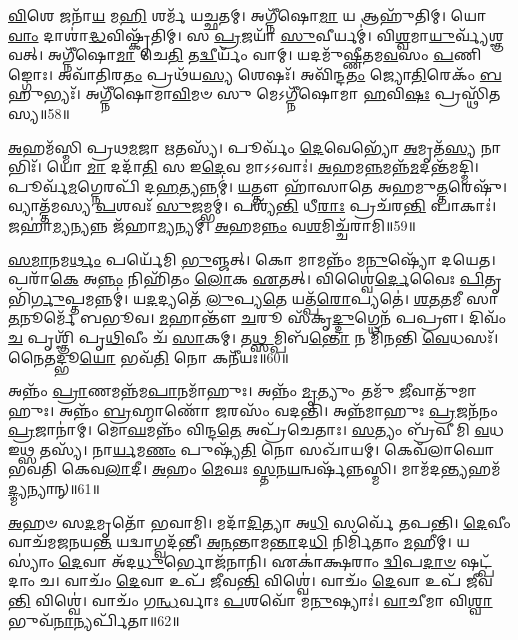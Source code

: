 \-\ul{𑌵𑌿}\-𑌶𑍇 𑌜𑌨𑌾᳴\-\ul{𑌯} 𑌮\-\ul{𑌹𑌿} 𑌶𑌰𑍍𑌮᳴ 𑌯𑌚𑍍𑌛𑌤𑌮𑍍।
𑌅𑌗𑍍𑌨𑍀᳴𑌷𑍋\-\ul{𑌮𑌾} 𑌯 𑌆𑌹𑍁᳴𑌤𑌿𑌮𑍍।
𑌯𑍋 \ul{𑌵𑌾𑌂} 𑌦𑌾𑌶𑌾॑\-\ul{𑌦𑍍𑌧}\-𑌵𑌿𑌷𑍍𑌕𑍃᳴𑌤𑌿𑌮𑍍।
𑌸 \ul{𑌪𑍍𑌰}\-𑌜𑌯𑌾᳴ \ul{𑌸𑍁}\-𑌵𑍀𑌰𑍍𑌯𑌮𑍍॑।
𑌵𑌿\-\ul{𑌶𑍍𑌵}\-𑌮𑌾\-\ul{𑌯𑍁}\-𑌰𑍍𑌵𑍍𑌯᳴𑌶𑍍𑌞𑌵𑌤𑍍।
𑌅𑌗𑍍𑌨𑍀᳴𑌷𑍋\-\ul{𑌮𑌾} 𑌚𑍇\-\ul{𑌤𑌿} 𑌤\-\ul{𑌦𑍍𑌵𑍀}\-𑌰𑍍𑌯𑌂᳴ 𑌵𑌾𑌮𑍍।
𑌯𑌦𑌮𑍁᳴𑌷𑍍𑌣𑍀𑌤𑌮\-\ul{𑌵}\-𑌸𑌂 \ul{𑌪}\-𑌣𑌿𑌙𑍍𑌗𑍋𑌃।
𑌅𑌵𑌾᳴𑌤𑌿𑌰\-\ul{𑌤𑌂} 𑌪𑍍𑌰𑌥᳴𑌯\-\ul{𑌸𑍍𑌯} 𑌶𑍇𑌷𑌃᳴।
𑌅𑌵𑌿᳴𑌨𑍍𑌦\-\ul{𑌤𑌂} 𑌜𑍍𑌯𑍋\-\ul{𑌤𑌿}\-𑌰𑍇𑌕𑌂᳴ \ul{𑌬}\-𑌹𑍁𑌭𑍍𑌯𑌃᳴।
𑌅𑌗𑍍𑌨𑍀᳴𑌷𑍋𑌮𑌾\-\ul{𑌵𑌿}\-𑌮𑍞 𑌸𑍁 𑌮𑍇𑌽𑌗𑍍𑌨𑍀᳴𑌷𑍋𑌮𑌾 \ul{𑌹}\-𑌵𑌿\-\ul{𑌷𑌃} 𑌪𑍍𑌰𑌸𑍍𑌥𑌿᳴𑌤𑌸𑍍𑌯॥58॥\anuvakamend[\-\ul{𑌜}\-\-\ul{𑌭𑌾}\-\-\ul{𑌰} 𑌦𑍍𑌯𑍗\-\ul{𑌰}\-𑌗𑍍𑌨𑍇\-\ul{𑌰𑍁}\-𑌪𑌸𑍍𑌥᳴ 𑌉\-\ul{𑌪}\-𑌕𑍍𑌷𑍍𑌯𑌨𑍍𑌤𑍋᳴ 𑌬𑌦𑍍𑌬\-\ul{𑌧𑌾}\-𑌨𑍋 \ul{𑌵}\-𑌧𑍍𑌵𑌾᳴ 𑌯𑌾𑌦᳴𑌮𑌾𑌨𑌃 𑌸\-\ul{𑌮𑍁}\-𑌦𑍍𑌰𑍇\-𑌽𑍞𑌹᳴\-\ul{𑌸𑌃} 𑌪𑍍𑌰𑌸𑍍𑌥𑌿᳴𑌤𑌸𑍍𑌯]

\-\ul{𑌅}\-𑌹𑌮᳴𑌸𑍍𑌮𑌿 𑌪𑍍𑌰𑌥\-\ul{𑌮}\-𑌜𑌾 \ul{𑌋}\-𑌤𑌸𑍍𑌯᳴।
𑌪𑍂𑌰𑍍𑌵𑌂᳴ \ul{𑌦𑍇}\-𑌵𑍇𑌭𑍍𑌯𑍋᳴ \ul{𑌅}\-𑌮𑍃𑌤᳴\-\ul{𑌸𑍍𑌯} 𑌨𑌾𑌭𑌿𑌃᳴।
𑌯𑍋 \ul{𑌮𑌾} 𑌦𑌦𑌾᳴\-\ul{𑌤𑌿} 𑌸 𑌇\-\ul{𑌦𑍇}\-𑌵 𑌮𑌾𑌽𑌽𑌵𑌾𑌃॑।
\-\ul{𑌅}\-𑌹𑌮\-\ul{𑌨𑍍𑌨}\-𑌮𑌨𑍍𑌨᳴\-\-\ul{𑌮}\-𑌦𑌨𑍍𑌤᳴\-𑌮𑌦𑍍𑌮𑌿।
𑌪𑍂𑌰𑍍𑌵᳴\-\ul{𑌮}\-𑌗𑍍𑌨𑍇𑌰𑌪𑌿᳴ 𑌦\-\ul{𑌹}\-𑌤𑍍𑌯𑌨𑍍𑌨𑌮𑍍॑।
\-\ul{𑌯}\-𑌤𑍍𑌤𑍗 𑌹𑌾᳴𑌸𑌾𑌤𑍇 𑌅𑌹𑌮𑍁\-\ul{𑌤𑍍𑌤}\-𑌰𑍇𑌷𑍁᳴।
𑌵𑍍𑌯𑌾𑌤𑍍𑌤᳴𑌮𑌸𑍍𑌯 \ul{𑌪}\-𑌶𑌵𑌃᳴ \ul{𑌸𑍁}\-𑌜𑌮𑍍𑌭𑌮𑍍॑।
𑌪𑌶𑍍𑌯᳴\-\ul{𑌨𑍍𑌤𑌿} 𑌧𑍀\-\ul{𑌰𑌾𑌃} 𑌪𑍍𑌰𑌚᳴𑌰\-\ul{𑌨𑍍𑌤𑌿} 𑌪𑌾𑌕𑌾𑌃॑।
𑌜𑌹𑌾॑\-\ul{𑌮𑍍𑌯}\-𑌨𑍍𑌯𑌨𑍍𑌨 𑌜᳴𑌹𑌾\-\ul{𑌮𑍍𑌯}\-𑌨𑍍𑌯𑌮𑍍।
\-\ul{𑌅}\-𑌹𑌮\-\ul{𑌨𑍍𑌨𑌂} 𑌵\-\ul{𑌶}\-𑌮𑌿𑌚𑍍𑌚᳴𑌰𑌾𑌮𑌿॥59॥

\-\ul{𑌸}\-\-\ul{𑌮𑌾}\-𑌨𑌮\-\ul{𑌰𑍍𑌥𑌂} 𑌪𑌰𑍍𑌯𑍇᳴𑌮𑌿 \ul{𑌭𑍁}\-𑌞𑍍𑌜𑌤𑍍।
𑌕𑍋 𑌮𑌾𑌮𑌨𑍍𑌨𑌂᳴ 𑌮\-\ul{𑌨𑍁}\-𑌷𑍍𑌯𑍋᳴ 𑌦𑌯𑍇𑌤।
𑌪𑌰𑌾᳴\-\ul{𑌕𑍇} 𑌅\-\ul{𑌨𑍍𑌨𑌂} 𑌨𑌿𑌹𑌿᳴𑌤𑌂 \ul{𑌲𑍋}\-𑌕 \ul{𑌏}\-𑌤𑌤𑍍।
𑌵𑌿𑌶𑍍𑌵𑍈॑\-\ul{𑌰𑍍𑌦𑍇}\-𑌵𑍈𑌃 \ul{𑌪𑌿}\-𑌤𑍃𑌭𑌿᳴\-\ul{𑌰𑍍𑌗𑍁}\-𑌪𑍍𑌤𑌮𑌨𑍍𑌨𑌮𑍍॑।
𑌯\-\ul{𑌦}\-𑌦𑍍𑌯𑌤𑍇᳴ \ul{𑌲𑍁}\-𑌪𑍍𑌯\-\ul{𑌤𑍇} 𑌯𑌤𑍍𑌪᳴\-\ul{𑌰𑍋}\-𑌪𑍍𑌯𑌤𑍇॑।
\-\ul{𑌶}\-\-\ul{𑌤}\-\-\ul{𑌤}\-𑌮𑍀 𑌸𑌾 \ul{𑌤}\-𑌨𑍂𑌰𑍍𑌮𑍇᳴ 𑌬𑌭𑍂𑌵।
\-\ul{𑌮}\-𑌹𑌾𑌨𑍍𑌤𑍗᳴ \ul{𑌚}\-𑌰𑍂 𑌸᳴𑌕𑍃\-\ul{𑌦𑍍𑌦𑍁}\-𑌗𑍍𑌧𑍇𑌨᳴ 𑌪𑌪𑍍𑌰𑍗।
𑌦𑌿𑌵𑌂᳴ \ul{𑌚} 𑌪𑍃𑌶𑍍𑌞𑌿᳴ 𑌪𑍃\-\ul{𑌥𑌿}\-𑌵𑍀𑌂 𑌚᳴ \ul{𑌸𑌾}\-𑌕𑌮𑍍।
𑌤\-\ul{𑌥𑍍𑌸}\-𑌮𑍍𑌪𑌿𑌬᳴\-\ul{𑌨𑍍𑌤𑍋} 𑌨 𑌮𑌿᳴𑌨𑌨𑍍𑌤𑌿 \ul{𑌵𑍇}\-𑌧𑌸𑌃᳴।
𑌨𑍈𑌤𑌦𑍍𑌭𑍂\-\ul{𑌯𑍋} 𑌭𑌵᳴\-\ul{𑌤𑌿} 𑌨𑍋 𑌕𑌨𑍀᳴𑌯𑌃॥60॥

𑌅𑌨𑍍𑌨𑌂᳴ \ul{𑌪𑍍𑌰𑌾}\-𑌣𑌮𑌨𑍍𑌨᳴𑌮\-\ul{𑌪𑌾}\-𑌨𑌮𑌾᳴𑌹𑍁𑌃।
𑌅𑌨𑍍𑌨𑌂᳴ \ul{𑌮𑍃}\-𑌤𑍍𑌯𑍁𑌂 𑌤𑌮𑍁᳴ \ul{𑌜𑍀}\-𑌵𑌾𑌤𑍁᳴𑌮𑌾𑌹𑍁𑌃।
𑌅𑌨𑍍𑌨𑌂᳴ \ul{𑌬𑍍𑌰}\-𑌹𑍍𑌮𑌾𑌣𑍋᳴ \ul{𑌜}\-𑌰𑌸𑌂᳴  𑌵𑌦𑌨𑍍𑌤𑌿।
𑌅𑌨𑍍𑌨᳴𑌮𑌾𑌹𑍁𑌃 \ul{𑌪𑍍𑌰}\-𑌜𑌨᳴𑌨𑌂 \ul{𑌪𑍍𑌰}\-𑌜𑌾𑌨𑌾॑𑌮𑍍।
𑌮𑍋\-\ul{𑌘}\-𑌮𑌨𑍍𑌨𑌂᳴ 𑌵𑌿𑌨𑍍𑌦\-\ul{𑌤𑍇} 𑌅𑌪𑍍𑌰᳴𑌚𑍇𑌤𑌾𑌃।
\-\ul{𑌸}\-𑌤𑍍𑌯𑌂 𑌬𑍍𑌰᳴𑌵𑍀𑌮𑌿 \ul{𑌵}\-𑌧 𑌇𑌥𑍍𑌸 𑌤𑌸𑍍𑌯᳴।
𑌨𑌾\-\ul{𑌰𑍍𑌯}\-𑌮\-\ul{𑌣𑌂} 𑌪𑍁𑌷𑍍𑌯᳴\-\ul{𑌤𑌿} 𑌨𑍋 𑌸𑌖𑌾᳴𑌯𑌮𑍍।
𑌕𑍇𑌵᳴𑌲𑌾𑌘𑍋 𑌭𑌵𑌤𑌿 𑌕𑍇𑌵\-\ul{𑌲𑌾}\-𑌦𑍀।
\-\ul{𑌅}\-𑌹𑌂 \ul{𑌮𑍇}\-𑌘𑌃 \ul{𑌸𑍍𑌤}\-𑌨\-\ul{𑌯}\-𑌨𑍍𑌵𑌰𑍍\mbox{}𑌷᳴𑌨𑍍𑌨𑌸𑍍𑌮𑌿।
𑌮𑌾𑌮᳴𑌦\-\ul{𑌨𑍍𑌤𑍍𑌯}\-𑌹𑌮᳴\-\ul{𑌦𑍍𑌮𑍍𑌯}\-𑌨𑍍𑌯𑌾𑌨𑍍॥61॥

\-\ul{𑌅}\-𑌹𑍞 𑌸\-\ul{𑌦}\-𑌮𑍃𑌤𑍋᳴ 𑌭𑌵𑌾𑌮𑌿।
𑌮𑌦𑌾᳴\-\ul{𑌦𑌿}\-𑌤𑍍𑌯𑌾 𑌅\-\ul{𑌧𑌿} 𑌸𑌰𑍍𑌵𑍇᳴ 𑌤𑌪𑌨𑍍𑌤𑌿।
\-\ul{𑌦𑍇}\-𑌵𑍀𑌂 𑌵𑌾𑌚᳴𑌮𑌜𑌨𑌯\-\ul{𑌨𑍍𑌤} 𑌯𑌦𑍍𑌵𑌾𑌗𑍍𑌵𑌦᳴𑌨𑍍𑌤𑍀।
\-\ul{𑌅}\-\-\ul{𑌨}\-𑌨𑍍𑌤𑌾𑌮\-\ul{𑌨𑍍𑌤𑌾}\-𑌦\-\ul{𑌧𑌿} 𑌨𑌿𑌰𑍍𑌮𑌿᳴𑌤𑌾𑌂 \ul{𑌮}\-𑌹𑍀𑌮𑍍।
𑌯𑌸𑍍𑌯𑌾𑌂॑ \ul{𑌦𑍇}\-𑌵𑌾 𑌅᳴𑌦\-\ul{𑌧𑍁}\-𑌰𑍍𑌭𑍋𑌜᳴𑌨𑌾𑌨𑌿।
𑌏𑌕𑌾॑𑌕𑍍𑌷𑌰𑌾𑌂 \ul{𑌦𑍍𑌵𑌿}\-𑌪\-\ul{𑌦𑌾}\-\-\ul{𑍞} 𑌷𑌟𑍍𑌪᳴𑌦𑌾𑌂 𑌚।
𑌵𑌾𑌚𑌂᳴ \ul{𑌦𑍇}\-𑌵𑌾 𑌉𑌪᳴ 𑌜𑍀𑌵\-\ul{𑌨𑍍𑌤𑌿} 𑌵𑌿𑌶𑍍𑌵𑍇॑।
𑌵𑌾𑌚𑌂᳴ \ul{𑌦𑍇}\-𑌵𑌾 𑌉𑌪᳴ 𑌜𑍀𑌵\-\ul{𑌨𑍍𑌤𑌿} 𑌵𑌿𑌶𑍍𑌵𑍇॑।
𑌵𑌾𑌚𑌂᳴ 𑌗\-\ul{𑌨𑍍𑌧}\-𑌰𑍍𑌵𑌾𑌃 \ul{𑌪}\-𑌶𑌵𑍋᳴ 𑌮\-\ul{𑌨𑍁}\-𑌷𑍍𑌯𑌾𑌃॑।
\-\ul{𑌵𑌾}\-𑌚𑍀𑌮𑌾 𑌵𑌿\-\ul{𑌶𑍍𑌵𑌾} 𑌭𑍁𑌵᳴\-\ul{𑌨𑌾}\-𑌨𑍍𑌯𑌰𑍍𑌪𑌿᳴𑌤𑌾॥62॥

